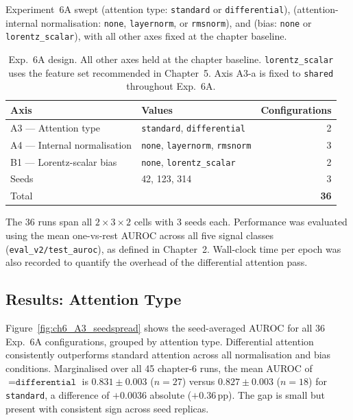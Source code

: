 Experiment~6A swept  (attention type: \texttt{standard} or
\texttt{differential}),  (attention-internal normalisation:
\texttt{none}, \texttt{layernorm}, or \texttt{rmsnorm}), and  (bias:
\texttt{none} or \texttt{lorentz\_scalar}), with all other axes fixed at the chapter
baseline.

\begin{table}[h]
\centering\small
\begin{tabular}{llr}
\toprule
Axis & Values & Configurations \\
\midrule
A3 — Attention type           & \texttt{standard}, \texttt{differential} & 2 \\
A4 — Internal normalisation   & \texttt{none}, \texttt{layernorm}, \texttt{rmsnorm} & 3 \\
B1 — Lorentz-scalar bias      & \texttt{none}, \texttt{lorentz\_scalar} & 2 \\
Seeds                         & 42, 123, 314 & 3 \\
\midrule
Total & & \textbf{36} \\
\bottomrule
\end{tabular}
\caption{Exp.~6A design. All other axes held at the chapter baseline.
  \texttt{lorentz\_scalar} uses the feature set recommended in Chapter~5.
  Axis A3-a is fixed to \texttt{shared} throughout Exp.~6A.}
\label{tab:ch6_exp6a_design}
\end{table}

The 36 runs span all $2 \times 3 \times 2$ cells with 3 seeds each. Performance was
evaluated using the mean one-vs-rest AUROC across all five signal classes
(\texttt{eval\_v2/test\_auroc}), as defined in Chapter~2. Wall-clock time per epoch was
also recorded to quantify the overhead of the differential attention pass.

\subsection{Results: Attention Type}
\label{subsec:ch6_attn_type_results}

Figure~\ref{fig:ch6_A3_seedspread} shows the seed-averaged AUROC for all 36 Exp.~6A
configurations, grouped by attention type. Differential attention consistently
outperforms standard attention across all normalisation and bias conditions.
Marginalised over all 45 chapter-6 runs, the mean AUROC of
${}=\texttt{differential}$ is $0.831 \pm 0.003$ ($n=27$) versus
$0.827 \pm 0.003$ ($n=18$) for \texttt{standard}, a difference of $+0.0036$ absolute
($+0.36$\,pp). The gap is small but present with consistent sign across seed replicas.

